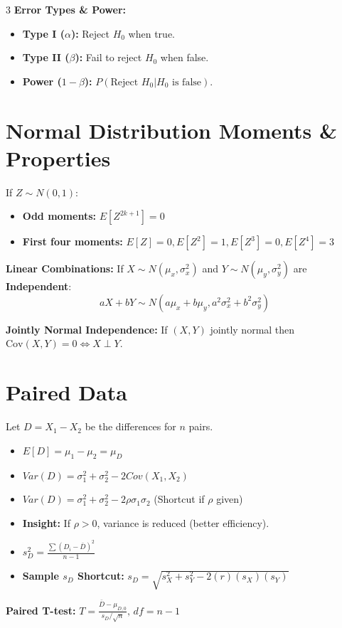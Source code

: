 \documentclass[10pt]{article}
\begin{document}
\begin{multicols}{3}
\textbf{Error Types \& Power:}
\begin{itemize}
    \item \textbf{Type I ($\alpha$):} Reject $H_0$ when true.
    \item \textbf{Type II ($\beta$):} Fail to reject $H_0$ when false.
    \item \textbf{Power ($1-\beta$):} $P(\text{Reject } H_0 | H_0 \text{ is false})$.
\end{itemize}

\section*{Normal Distribution Moments \& Properties}
If $Z \sim N(0,1)$:
\begin{itemize}
    \item \textbf{Odd moments:} $E[Z^{2k+1}] = 0$
    \item \textbf{First four moments:} $E[Z]=0, E[Z^2]=1, E[Z^3]=0, E[Z^4]=3$
\end{itemize}

\textbf{Linear Combinations:} If $X \sim N(\mu_x, \sigma_x^2)$ and $Y \sim N(\mu_y, \sigma_y^2)$ are \textbf{Independent}:
\[ aX + bY \sim N(a\mu_x + b\mu_y, a^2\sigma_x^2 + b^2\sigma_y^2) \]

\textbf{Jointly Normal Independence:} If $(X,Y)$ jointly normal then $\text{Cov}(X,Y) = 0 \iff X \perp Y$.

\section*{Paired Data}
Let $D = X_1 - X_2$ be the differences for $n$ pairs.
\begin{itemize}
    \item $E[D] = \mu_1 - \mu_2 = \mu_D$
    \item $Var(D) = \sigma_1^2 + \sigma_2^2 - 2Cov(X_1, X_2)$
    \item $Var(D) = \sigma_1^2 + \sigma_2^2 - 2\rho\sigma_1\sigma_2$ (Shortcut if $\rho$ given)
    \item \textbf{Insight:} If $\rho > 0$, variance is reduced (better efficiency).
    \item $s_D^2 = \frac{\sum (D_i - \bar{D})^2}{n-1}$
    \item \textbf{Sample $s_D$ Shortcut:} $s_D = \sqrt{s_X^2 + s_Y^2 - 2(r)(s_X)(s_Y)}$
\end{itemize}
\textbf{Paired T-test:} $T = \frac{\bar{D} - \mu_{D,0}}{s_D / \sqrt{n}}, \, df = n - 1$


\end{multicols}
\end{document}
